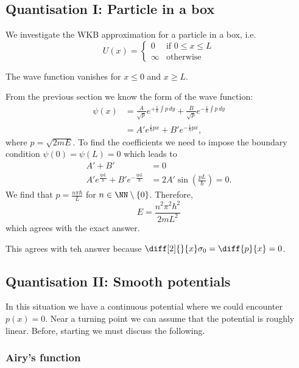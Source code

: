\documentclass[12pt, a4paper]{article}
\begin{document}
\subsection{Quantisation I: Particle in a box}

We investigate the WKB approximation for a particle in a box, i.e. 
\[U(x) = \begin{cases}
    0 &\text{if } 0 \leq x \leq L \\
    \infty &\text{otherwise} 
\end{cases}\]

\begin{mdnote}
    The wave function vanishes for \(x\leq 0\) and \(x\geq L\).
\end{mdnote}

\noindent From the previous section we know the form of the wave function:
\[\begin{aligned}
    \psi(x) &= \frac{A}{\sqrt{p}}e^{+\frac{i}{\hbar} \int p \, dy}+\frac{B}{\sqrt{p}}e^{-\frac{i}{\hbar} \int p\, dy} \\
    &=A'e^{\frac{i}{\hbar} px}+ B'e^{-\frac{i}{\hbar} px},
\end{aligned}\]
where \(p=\sqrt{2mE}\). To find the coefficients we need to impose the boundary condition \(\psi(0)=\psi(L)=0\) which leads to 
\[\begin{aligned}
    A'+B'&=0 \\
    A'e^{\frac{ipL}{\hbar}}+B'e^{-\frac{ipL}{\hbar}} &= 2A'\sin\left( \frac{pL}{\hbar} \right) = 0.
\end{aligned}\]
We find that \(p = \frac{n\pi \hbar}{L }\) for \(n \in \NN \setminus \{0\}\). Therefore,
\[E = \frac{n^2 \pi^2 \hbar^2}{2mL^2}\]
which agrees with the exact answer.

\begin{mdremark}
    This agrees with teh answer because \(\diff[2]{}{x}\sigma_0 = \diff{p}{x}=0\).
\end{mdremark}

\subsection{Quantisation II: Smooth potentials}

In this situation we have a continuous potential where we could encounter \(p(x)=0\). Near a turning point we can assume that the potential is roughly linear. Before, starting we must discuss the following.

\subsubsection{Airy's function}
\end{document}
